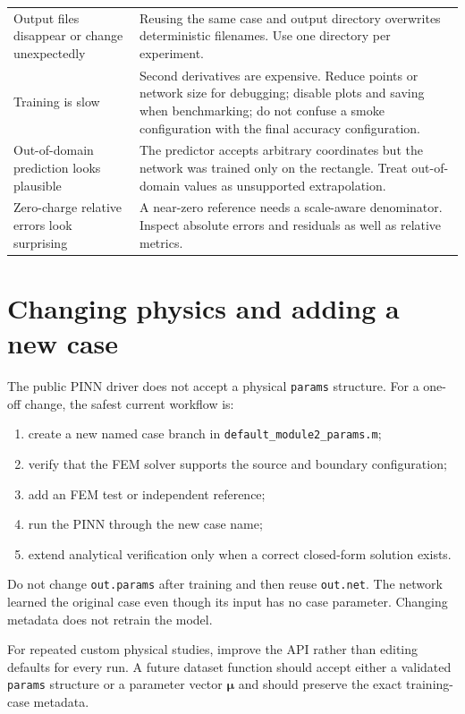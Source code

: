 \documentclass[11pt]{article}
\begin{document}
\begin{longtable}{>{\RaggedRight\arraybackslash}p{} >{\RaggedRight\arraybackslash}p{}}
Output files disappear or change unexpectedly & Reusing the same case and output directory overwrites deterministic filenames. Use one directory per experiment. \\
Training is slow & Second derivatives are expensive. Reduce points or network size for debugging; disable plots and saving when benchmarking; do not confuse a smoke configuration with the final accuracy configuration. \\
Out-of-domain prediction looks plausible & The predictor accepts arbitrary coordinates but the network was trained only on the rectangle. Treat out-of-domain values as unsupported extrapolation. \\
Zero-charge relative errors look surprising & A near-zero reference needs a scale-aware denominator. Inspect absolute errors and residuals as well as relative metrics. \\
\bottomrule
\end{longtable}

\section{Changing physics and adding a new case}

The public PINN driver does not accept a physical \texttt{params} structure. For a one-off change, the safest current workflow is:
\begin{enumerate}[leftmargin=*]
  \item create a new named case branch in \texttt{default\_module2\_params.m};
  \item verify that the FEM solver supports the source and boundary configuration;
  \item add an FEM test or independent reference;
  \item run the PINN through the new case name;
  \item extend analytical verification only when a correct closed-form solution exists.
\end{enumerate}

Do not change \texttt{out.params} after training and then reuse \texttt{out.net}. The network learned the original case even though its input has no case parameter. Changing metadata does not retrain the model.

For repeated custom physical studies, improve the API rather than editing defaults for every run. A future dataset function should accept either a validated \texttt{params} structure or a parameter vector $\boldsymbol{\mu}$ and should preserve the exact training-case metadata.
\end{document}
